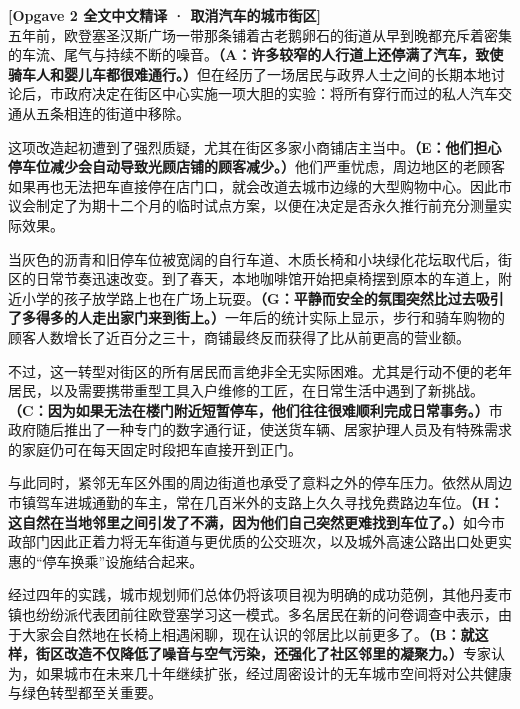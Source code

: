 \begin{transbox}
\small
\textbf{\color{NCDTeal}[Opgave 2 全文中文精译 · 取消汽车的城市街区]}\\
五年前，欧登塞圣汉斯广场一带那条铺着古老鹅卵石的街道从早到晚都充斥着密集的车流、尾气与持续不断的噪音。\textbf{（A：许多较窄的人行道上还停满了汽车，致使骑车人和婴儿车都很难通行。）}但在经历了一场居民与政界人士之间的长期本地讨论后，市政府决定在街区中心实施一项大胆的实验：将所有穿行而过的私人汽车交通从五条相连的街道中移除。

这项改造起初遭到了强烈质疑，尤其在街区多家小商铺店主当中。\textbf{（E：他们担心停车位减少会自动导致光顾店铺的顾客减少。）}他们严重忧虑，周边地区的老顾客如果再也无法把车直接停在店门口，就会改道去城市边缘的大型购物中心。因此市议会制定了为期十二个月的临时试点方案，以便在决定是否永久推行前充分测量实际效果。

当灰色的沥青和旧停车位被宽阔的自行车道、木质长椅和小块绿化花坛取代后，街区的日常节奏迅速改变。到了春天，本地咖啡馆开始把桌椅摆到原本的车道上，附近小学的孩子放学路上也在广场上玩耍。\textbf{（G：平静而安全的氛围突然比过去吸引了多得多的人走出家门来到街上。）}一年后的统计实际上显示，步行和骑车购物的顾客人数增长了近百分之三十，商铺最终反而获得了比从前更高的营业额。

不过，这一转型对街区的所有居民而言绝非全无实际困难。尤其是行动不便的老年居民，以及需要携带重型工具入户维修的工匠，在日常生活中遇到了新挑战。\textbf{（C：因为如果无法在楼门附近短暂停车，他们往往很难顺利完成日常事务。）}市政府随后推出了一种专门的数字通行证，使送货车辆、居家护理人员及有特殊需求的家庭仍可在每天固定时段把车直接开到正门。

与此同时，紧邻无车区外围的周边街道也承受了意料之外的停车压力。依然从周边市镇驾车进城通勤的车主，常在几百米外的支路上久久寻找免费路边车位。\textbf{（H：这自然在当地邻里之间引发了不满，因为他们自己突然更难找到车位了。）}如今市政部门因此正着力将无车街道与更优质的公交班次，以及城外高速公路出口处更实惠的“停车换乘”设施结合起来。

经过四年的实践，城市规划师们总体仍将该项目视为明确的成功范例，其他丹麦市镇也纷纷派代表团前往欧登塞学习这一模式。多名居民在新的问卷调查中表示，由于大家会自然地在长椅上相遇闲聊，现在认识的邻居比以前更多了。\textbf{（B：就这样，街区改造不仅降低了噪音与空气污染，还强化了社区邻里的凝聚力。）}专家认为，如果城市在未来几十年继续扩张，经过周密设计的无车城市空间将对公共健康与绿色转型都至关重要。
\end{transbox}

